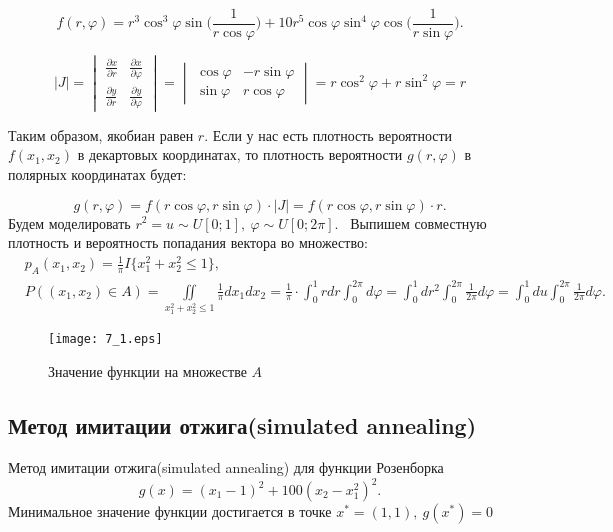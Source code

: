 \documentclass[11pt]{article}
\begin{document}
$$
f(r, \varphi) = r^3 \cos^3{\varphi} \sin{\Big( \frac{1}{r \cos{\varphi}} \Big)} + 10r^5 \cos{\varphi} \sin^4{\varphi} \cos{\Big( \frac{1}{r \sin{\varphi}} \Big)}.
$$


$$
|J| = \begin{vmatrix}
    \frac{\partial x}{\partial r} & \frac{\partial x}{\partial \varphi} \\
    \frac{\partial y}{\partial r} & \frac{\partial y}{\partial \varphi}
\end{vmatrix} =
\begin{vmatrix}
    \cos \varphi & -r \sin \varphi \\
    \sin \varphi & r \cos \varphi
\end{vmatrix} = r \cos^2 \varphi + r \sin^2 \varphi = r
$$

Таким образом, якобиан равен \( r \). Если у нас есть плотность вероятности $f(x_1, x_2) $ в декартовых координатах, то плотность вероятности $ g(r, \varphi) $ в полярных координатах будет:

$$
g(r, \varphi) = f(r \cos \varphi, r \sin \varphi) \cdot |J| = f(r \cos \varphi, r \sin \varphi) \cdot r.
$$
Будем моделировать $r^2 = u \sim U[0;1],~ \varphi \sim U[0;2\pi]$. \
Выпишем совместную плотность и вероятность попадания вектора во множество:
$$
\begin{aligned}
    & p_A(x_1, x_2) = \frac{1}{\pi} I \{ x_1^2 + x_2^2 \leqslant 1 \}, \\
    & P\left(\left(x_1, x_2\right) \in A\right)=\iint\limits_{x_1^2+x_2^2 \leqslant 1} \frac{1}{\pi} d x_1 d x_2=\frac{1}{\pi} \cdot \int_0^1 r d r \int_0^{2 \pi} d \varphi=\int_0^1 d r^2 \int_0^{2 \pi} \frac{1}{2 \pi} d \varphi=\int_0^1 d u \int_0^{2 \pi} \frac{1}{2 \pi} d \varphi .
\end{aligned}
$$

\begin{figure}[ht]
    \texttt{[image: 7\_1.eps]} 
    \caption{Значение функции на множестве $A$}
\end{figure} 

\FloatBarrier

\subsection{Метод имитации отжига(simulated annealing)}
Метод имитации отжига(simulated annealing) для функции Розенборка
$$
    g(x) = (x_1 - 1)^2 + 100(x_2 - x_1^2)^2.
$$
Минимальное значение функции достигается в точке $x^{*} = (1, 1),~ g(x^{*}) = 0$
\end{document}
